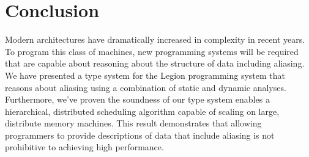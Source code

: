 
\section{Conclusion}
\label{sect:conclusion}

Modern architectures have dramatically increased in complexity in recent years.  To program this class
of machines, new programming systems will be required that are capable about reasoning about the structure
of data including aliasing.  We have presented a type system for the Legion programming system that
reasons about aliasing using a combination of static and dynamic analyses.  Furthermore, we've proven
the soundness of our type system enables a hierarchical, distributed scheduling algorithm capable
of scaling on large, distribute memory machines.  This result demonstrates that allowing programmers
to provide descriptions of data that include aliasing is not prohibitive to achieving high performance.


